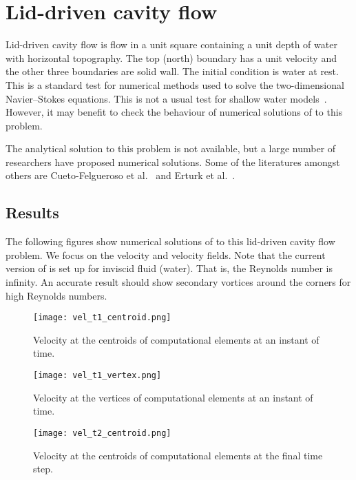 
\section{Lid-driven cavity flow}

Lid-driven cavity flow is flow in a unit square containing a unit depth of water with horizontal topography. The top (north) boundary has a unit velocity and the other three boundaries are solid wall. The initial condition is water at rest. This is a standard test for numerical methods used to solve the two-dimensional Navier--Stokes equations. This is not a usual test for shallow water models~\cite{CCFNC2006}. However, it may benefit to check the behaviour of numerical solutions of \anuga{} to this problem.

The analytical solution to this problem is not available, but a large number of researchers have proposed numerical solutions. Some of the literatures amongst others are Cueto-Felgueroso et al.~\cite{CCFNC2006} and Erturk et al.~\cite{ECG2005}.


\subsection{Results}

The following figures show numerical solutions of \anuga{} to this lid-driven cavity flow problem. We focus on the velocity and velocity fields. Note that the current version of \anuga{} is set up for inviscid fluid (water). That is, the Reynolds number is infinity. An accurate result should show secondary vortices around the corners for high Reynolds numbers.

\begin{figure}
\begin{center}
\texttt{[image: vel\_t1\_centroid.png]}
\end{center}
\caption{Velocity at the centroids of computational elements at an instant of time.}
\end{figure}


\begin{figure}
\begin{center}
\texttt{[image: vel\_t1\_vertex.png]}
\end{center}
\caption{Velocity at the vertices of computational elements at an instant of time.}
\end{figure}


\begin{figure}
\begin{center}
\texttt{[image: vel\_t2\_centroid.png]}
\end{center}
\caption{Velocity at the centroids of computational elements at the final time step.}
\end{figure}


